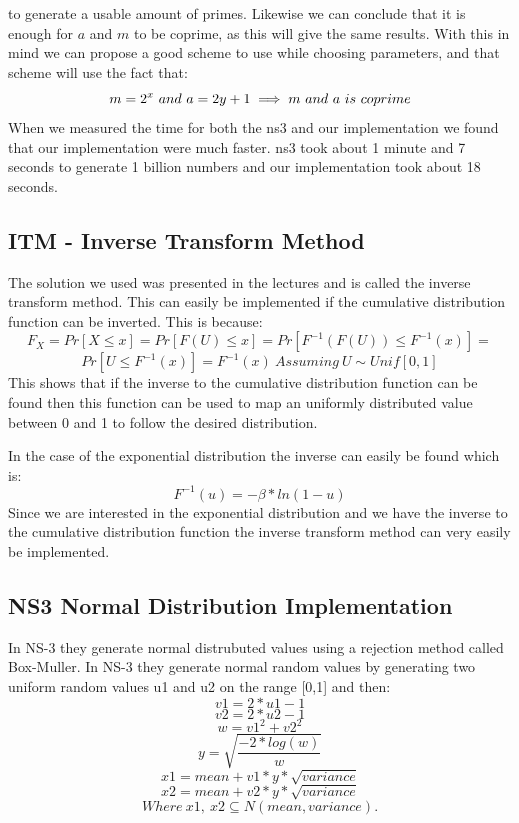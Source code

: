 \documentclass{article}
\begin{document}
    to generate a usable amount of primes.
    Likewise we can conclude that it is enough for $a$ and $m$ to be coprime, as this will give the same results.
    With this in mind we can propose a good scheme to use while choosing parameters, and that scheme will use the fact that:
    \begin{equation}
      m = 2^{x}\ and\ a = 2y+1 \implies m\ and\ a\ is\ coprime \\
    \end{equation}
    When we measured the time for both the ns3 and our implementation we found that our implementation were much faster.
    ns3 took about 1 minute and 7 seconds to generate 1 billion numbers and our implementation took about 18 seconds.
  \subsection{ITM - Inverse Transform Method}
  The solution we used was presented in the lectures and is called the inverse transform method.
  This can easily be implemented if the cumulative distribution function can be inverted.
  This is because:
  $$ F_{X}=Pr[X \leqslant x]=Pr[F(U) \leqslant x]=Pr[F^{-1}(F(U)) \leqslant F^{-1}(x)]= $$
  $$ Pr[U \leqslant F^{-1}(x)]=F^{-1}(x)\ Assuming\ U \sim Unif[0,1] $$
  This shows that if the inverse to the cumulative distribution function can be found then this function can be used to map an uniformly distributed value between 0 and 1 to follow the desired distribution.
  
  In the case of the exponential distribution the inverse can easily be found which is:
  $$ F^{-1}(u)=-\beta * ln(1-u) $$
  Since we are interested in the exponential distribution and we have the inverse to the cumulative distribution function the inverse transform method can very easily be implemented.
  
  \subsection{NS3 Normal Distribution Implementation}
  In NS-3 they generate normal distrubuted values using a rejection method called Box-Muller. In NS-3 they generate normal random values by generating two uniform random values u1 and u2 on the range [0,1] and then:
  $$v1 = 2 * u1 - 1$$
  $$v2 = 2 * u2 - 1$$
  $$w = v1^2 + v2^2$$
  $$y = \sqrt{\frac{-2*log(w)}{w}}$$
  $$x1 = mean + v1 * y * \sqrt{variance}$$
  $$x2 = mean + v2 * y * \sqrt{variance}$$
  $$Where\ x1,\ x2 \subseteq N(mean,variance).$$
  
\end{document}
